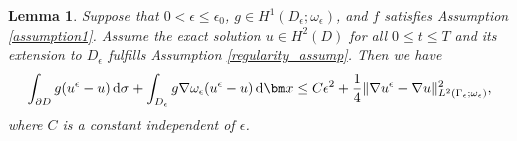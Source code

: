 \documentclass[3p,times]{elsarticle}
\newtheorem{lemma}{Lemma}[section]
\numberwithin{equation}{section}
\newcommand{\dd}{\,{\rm d}}
\newcommand{\divo}{\,{\rm div}}
\begin{document}
\begin{lemma}
	\label{lemma3}
	Suppose that $0<\epsilon\leq \epsilon_0$,  $g\in H^1(D_{\epsilon};\omega_{\epsilon}) $, and $f$ satisfies  Assumption \ref{assumption1}. Assume the exact solution $u\in H^2(D)$ for all $0\leq t\leq T$ and its extension  to $D_\epsilon$ fulfills Assumption  \ref{regularity_assump}. Then we have
	\begin{equation}
		\label{lemma3-1}
		\int_{\partial D}g(u^{\epsilon}-u)\dd \sigma+\int_{D_{\epsilon}} g\nabla\omega_{\epsilon}(u^{\epsilon}-u)\dd \bm x\leq C\epsilon^2+\frac 1 4\|\nabla u^{\epsilon}-\nabla u\|_{L^2(\Gamma_{\epsilon};\omega_{\epsilon})}^2,
	\end{equation}
	where $C$ is a constant independent of $\epsilon$.
\end{lemma}
\end{document}
